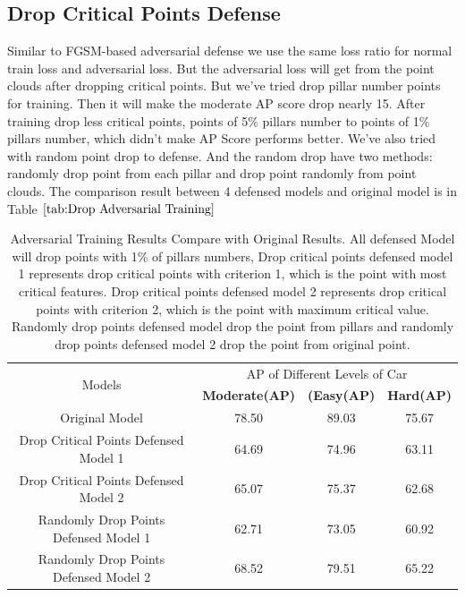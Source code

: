 \subsection{Drop Critical Points Defense}
Similar to FGSM-based adversarial defense we use the same loss ratio for normal train loss and adversarial loss. But the adversarial loss will get from the point clouds after dropping critical points. But we've tried drop pillar number points for training. Then it will make the moderate AP score drop nearly 15. After training drop less critical points, points of 5\% pillars number to points of 1\% pillars number, which didn't make AP Score performs better. We've also tried with random point drop to defense. And the random drop have two methods:
randomly drop point from each pillar and drop point randomly from point clouds. The comparison result between 4 defensed models and original model is in Table \(\ref{tab:Drop Adversarial Training}\)
 \begin{table}[!htbp]
  \begin{center}
    
    \begin{tabular}{|c|c|c|c|} %
      \hline
      \multirow{2}{*}{Models} & \multicolumn{3}{c|}{AP of Different Levels of Car}\\
    \cline{2-4}
       &\textbf{Moderate(AP)} & \textbf{(Easy(AP)}& \textbf{Hard(AP)}\\
      \hline
      Original Model & 78.50 & 89.03 & 75.67\\
      Drop Critical Points Defensed Model 1 & 64.69 & 74.96& 63.11\\
      Drop Critical Points Defensed Model 2 & 65.07 & 75.37& 62.68\\
      Randomly Drop Points Defensed Model 1& 62.71 & 73.05&60.92\\
      Randomly Drop Points Defensed Model 2& 68.52 & 79.51&65.22\\
    \hline
    \end{tabular}
\caption{Adversarial Training Results Compare with Original Results. All defensed Model will drop points with 1\% of pillars numbers, Drop critical points defensed model 1 represents drop critical points with criterion 1, which is the point with most critical features. Drop critical points defensed model 2 represents drop critical points with criterion 2, which is the point with maximum critical value. Randomly drop points defensed model drop the point from pillars and randomly drop points defensed model 2 drop the point from original point.}
  \end{center}
  \label{tab:Drop Adversarial Training}
\end{table}
